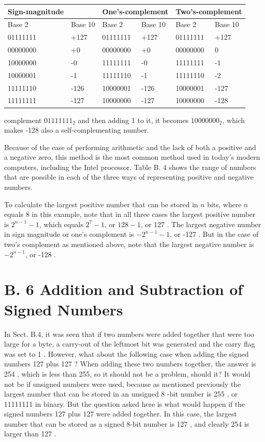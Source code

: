 \documentclass[10pt]{book}
\begin{document}
\begin{center}
\begin{center}
\begin{center}
\begin{center}
\begin{center}
\begin{center}
\begin{tabular}{|l|l|l|l|l|l|}
\hline
Sign-magnitude &  & \multicolumn{2}{|l|}{One's-complement} & \multicolumn{2}{l|}{Two's-complement} \\
\hline
Base 2 & Base 10 & Base 2 & Base 10 & Base 2 & Base 10 \\
\hline
01111111 & +127 & 01111111 & +127 & 01111111 & +127 \\
\hline
00000000 & +0 & 00000000 & +0 & 00000000 & 0 \\
\hline
10000000 & -0 & 11111111 & -0 & 11111111 & -1 \\
\hline
10000001 & -1 & 11111110 & -1 & 11111110 & -2 \\
\hline
11111110 & -126 & 10000001 & -126 & 10000001 & -127 \\
\hline
11111111 & -127 & 10000000 & -127 & 10000000 & -128 \\
\hline
\end{tabular}
\end{center}

complement $01111111_{2}$ and then adding 1 to it, it becomes $10000000_{2}$, which makes -128 also a self-complementing number.

Because of the ease of performing arithmetic and the lack of both a positive and a negative zero, this method is the most common method used in today's modern computers, including the Intel processor. Table B. 4 shows the range of numbers that are possible in each of the three ways of representing positive and negative numbers.

To calculate the largest positive number that can be stored in $n$ bits, where $n$ equals 8 in this example, note that in all three cases the largest positive number is $2^{n-1}-1$, which equals $2^{7}-1$, or $128-1$, or 127 . The largest negative number in sign magnitude or one's complement is $-2^{n-1}-1$, or -127 . But in the case of two's complement as mentioned above, note that the largest negative number is $-2^{n-1}$, or -128 .

\section*{B. 6 Addition and Subtraction of Signed Numbers}
In Sect. B.4, it was seen that if two numbers were added together that were too large for a byte, a carry-out of the leftmost bit was generated and the carry flag was set to 1 . However, what about the following case when adding the signed numbers 127 plus 127 ? When adding these two numbers together, the answer is 254 , which is less than 255, so it should not be a problem, should it? It would not be if unsigned numbers were used, because as mentioned previously the largest number that can be stored in an unsigned 8 -bit number is 255 , or 11111111 in binary. But the question asked here is what would happen if the signed numbers 127 plus 127 were added together. In this case, the largest number that can be stored as a signed 8-bit number is 127 , and clearly 254 is larger than 127 .


\end{center}
\end{center}
\end{center}
\end{center}
\end{center}
\end{document}

